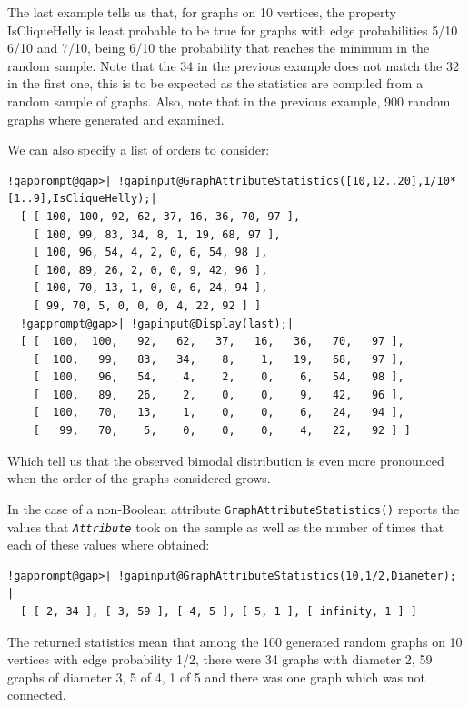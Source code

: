 \documentclass[a4paper,11pt]{report}
\begin{document}
{{{The last example tells us that, for graphs on 10 vertices, the property
IsCliqueHelly is least probable to be true for graphs with edge probabilities
5/10 6/10 and 7/10, being 6/10 the probability that reaches the minimum in the
random sample. Note that the 34 in the previous example does not match the 32
in the first one, this is to be expected as the statistics are compiled from a
random sample of graphs. Also, note that in the previous example, 900 random
graphs where generated and examined. 

We can also specify a list of orders to consider: 

 
\begin{Verbatim}[commandchars=!@|,fontsize=\small,frame=single,label=Example]
  !gapprompt@gap>| !gapinput@GraphAttributeStatistics([10,12..20],1/10*[1..9],IsCliqueHelly);|
  [ [ 100, 100, 92, 62, 37, 16, 36, 70, 97 ], 
    [ 100, 99, 83, 34, 8, 1, 19, 68, 97 ], 
    [ 100, 96, 54, 4, 2, 0, 6, 54, 98 ], 
    [ 100, 89, 26, 2, 0, 0, 9, 42, 96 ], 
    [ 100, 70, 13, 1, 0, 0, 6, 24, 94 ], 
    [ 99, 70, 5, 0, 0, 0, 4, 22, 92 ] ]
  !gapprompt@gap>| !gapinput@Display(last);|
  [ [  100,  100,   92,   62,   37,   16,   36,   70,   97 ],
    [  100,   99,   83,   34,    8,    1,   19,   68,   97 ],
    [  100,   96,   54,    4,    2,    0,    6,   54,   98 ],
    [  100,   89,   26,    2,    0,    0,    9,   42,   96 ],
    [  100,   70,   13,    1,    0,    0,    6,   24,   94 ],
    [   99,   70,    5,    0,    0,    0,    4,   22,   92 ] ]
\end{Verbatim}
 

Which tell us that the observed bimodal distribution is even more pronounced
when the order of the graphs considered grows. 

In the case of a non-Boolean attribute \texttt{GraphAttributeStatistics()} reports the values that \mbox{\texttt{\mdseries\slshape Attribute}} took on the sample as well as the number of times that each of these values
where obtained: 

 
\begin{Verbatim}[commandchars=!@|,fontsize=\small,frame=single,label=Example]
  !gapprompt@gap>| !gapinput@GraphAttributeStatistics(10,1/2,Diameter);     |
  [ [ 2, 34 ], [ 3, 59 ], [ 4, 5 ], [ 5, 1 ], [ infinity, 1 ] ]
\end{Verbatim}
 

The returned statistics mean that among the 100 generated random graphs on 10
vertices with edge probability 1/2, there were 34 graphs with diameter 2, 59
graphs of diameter 3, 5 of 4, 1 of 5 and there was one graph which was not
connected. 

}}}
\end{document}
